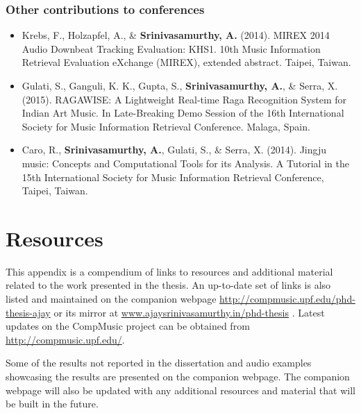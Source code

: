 \subsection*{Other contributions to conferences}
\begin{itemize}[leftmargin=*]
	\item Krebs, F., Holzapfel, A., \& \textbf{Srinivasamurthy, A.} (2014). MIREX 2014 Audio Downbeat Tracking Evaluation: KHS1. 10th Music Information Retrieval Evaluation eXchange (MIREX), extended abstract. Taipei, Taiwan.  
	\item Gulati, S., Ganguli, K. K., Gupta, S., \textbf{Srinivasamurthy, A.}, \& Serra, X. (2015). RAGAWISE: A Lightweight Real-time Raga Recognition System for Indian Art Music. In Late-Breaking Demo Session of the 16th International Society for Music Information Retrieval Conference. Malaga, Spain. 
	\item Caro, R., \textbf{Srinivasamurthy, A.}, Gulati, S., \& Serra, X. (2014). Jingju music: Concepts and Computational Tools for its Analysis. A Tutorial in the 15th International Society for Music Information Retrieval Conference, Taipei, Taiwan. 
\end{itemize}
%
%
\chapter{Resources}\label{app:resources}
This appendix is a compendium of links to resources and additional material related to the work presented in the thesis. An up-to-date set of links is also listed and maintained on the companion webpage \url{http://compmusic.upf.edu/phd-thesis-ajay} or its mirror at \url{www.ajaysrinivasamurthy.in/phd-thesis} . Latest updates on the CompMusic project can be obtained from \url{http://compmusic.upf.edu/}. 

Some of the results not reported in the dissertation and audio examples showcasing the results are presented on the companion webpage. The companion webpage will also be updated with any additional resources and material that will be built in the future. 
%
